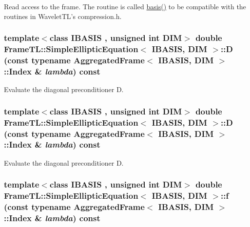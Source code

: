 Read access to the frame. The routine is called \hyperlink{classFrameTL_1_1SimpleEllipticEquation_b0d14a3117004cec09cca7b665c962d0}{basis()} to be compatible with the routines in WaveletTL's compression.h. \hypertarget{classFrameTL_1_1SimpleEllipticEquation_7fa64961d69cccd58143f6908eccb8b4}{
\subsubsection[{D}]{\setlength{\rightskip}{0pt plus 5cm}template$<$class IBASIS , unsigned int DIM$>$ double {\bf FrameTL::SimpleEllipticEquation}$<$ IBASIS, DIM $>$::D (const typename {\bf AggregatedFrame}$<$ IBASIS, DIM $>$::{\bf Index} \& {\em lambda}) const}}
\label{classFrameTL_1_1SimpleEllipticEquation_7fa64961d69cccd58143f6908eccb8b4}


Evaluate the diagonal preconditioner D. \hypertarget{classFrameTL_1_1SimpleEllipticEquation_7fa64961d69cccd58143f6908eccb8b4}{
\subsubsection[{D}]{\setlength{\rightskip}{0pt plus 5cm}template$<$class IBASIS , unsigned int DIM$>$ double {\bf FrameTL::SimpleEllipticEquation}$<$ IBASIS, DIM $>$::D (const typename {\bf AggregatedFrame}$<$ IBASIS, DIM $>$::{\bf Index} \& {\em lambda}) const}}
\label{classFrameTL_1_1SimpleEllipticEquation_7fa64961d69cccd58143f6908eccb8b4}


Evaluate the diagonal preconditioner D. \hypertarget{classFrameTL_1_1SimpleEllipticEquation_20fd2926333555fbd8c4ecf6d062c2e5}{
\subsubsection[{f}]{\setlength{\rightskip}{0pt plus 5cm}template$<$class IBASIS , unsigned int DIM$>$ double {\bf FrameTL::SimpleEllipticEquation}$<$ IBASIS, DIM $>$::f (const typename {\bf AggregatedFrame}$<$ IBASIS, DIM $>$::{\bf Index} \& {\em lambda}) const}}
\label{classFrameTL_1_1SimpleEllipticEquation_20fd2926333555fbd8c4ecf6d062c2e5}


